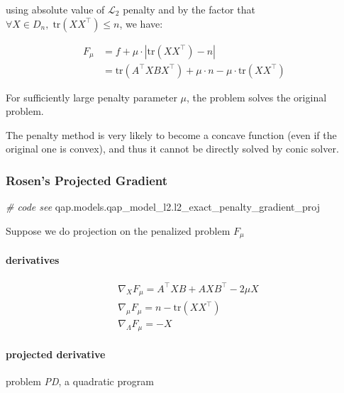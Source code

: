 \documentclass[
  10pt,
  a4paper,
,tablecaptionabove
]{scrartcl}
\newenvironment{Shaded}{}{}
\newcommand{\CommentTok}[1]{\textcolor[rgb]{0.38,0.63,0.69}{\textit{#1}}}
\newcommand{\NormalTok}[1]{#1}
\begin{document}
using absolute value of \(\mathscr L_2\) penalty and by the factor that
\(\forall X \in D_n ,\; \textrm{tr}(XX^\top)\le n\), we have:

\[\begin{aligned}
F_{\mu} & =  f  + \mu\cdot | \textrm{tr}(XX^\top ) -  n| \\
 &= \textrm{tr}(A^\top XB X^\top)  + \mu\cdot n - \mu\cdot \textrm{tr}(XX^\top )
\end{aligned}\]

For sufficiently large penalty parameter \(\mu\), the problem solves the
original problem.

The penalty method is very likely to become a concave function (even if
the original one is convex), and thus it cannot be directly solved by
conic solver.

\hypertarget{rosens-projected-gradient}{%
\subsubsection{Rosen's Projected
Gradient}\label{rosens-projected-gradient}}

\begin{Shaded}
\begin{Highlighting}[]
\CommentTok{\# code see}
\NormalTok{qap.models.qap\_model\_l2.l2\_exact\_penalty\_gradient\_proj}
\end{Highlighting}
\end{Shaded}

Suppose we do projection on the penalized problem \(F_\mu\)

\hypertarget{derivatives}{%
\paragraph{derivatives}\label{derivatives}}

\[\begin{aligned}
& \nabla_X F_\mu  = A^\top XB + AXB^\top - 2\mu X \\
& \nabla_\mu F_\mu  = n - \textrm{tr}(XX^\top) \\
& \nabla_\Lambda F_\mu  = - X
\end{aligned}\]

\hypertarget{projected-derivative}{%
\paragraph{projected derivative}\label{projected-derivative}}

problem \emph{PD}, a quadratic program
\end{document}
